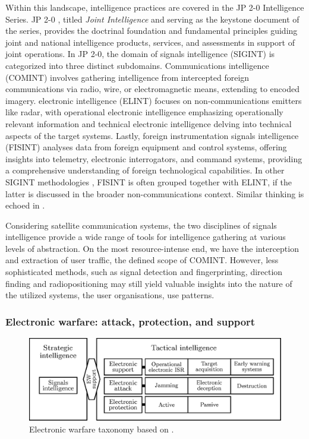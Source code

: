 \documentclass[english, 12pt, a4paper, elec, utf8, a-1b, online]{aaltothesis}
\begin{document}
Within this landscape, intelligence practices are covered in the JP 2-0 Intelligence Series.
JP 2-0 \cite{jp2-0}, titled \textit{Joint Intelligence} and serving as the keystone document of the series, provides the doctrinal foundation and fundamental principles guiding joint and national intelligence products, services, and assessments in support of joint operations.
In JP 2-0, the domain of signals intelligence (SIGINT) is categorized into three distinct subdomains. Communications intelligence (COMINT) involves gathering intelligence from intercepted foreign communications via radio, wire, or electromagnetic means, extending to encoded imagery.
electronic intelligence (ELINT) focuses on non-communications emitters like radar, with operational electronic intelligence emphasizing operationally relevant information and technical electronic intelligence delving into technical aspects of the target systems.
Lastly, foreign instrumentation signals intelligence (FISINT) analyses data from foreign equipment and control systems, offering insights into telemetry, electronic interrogators, and command systems, providing a comprehensive understanding of foreign technological capabilities.
In other SIGINT methodologies \cite{kosola2013digitaalinen}, FISINT is often grouped together with ELINT, if the latter is discussed in the broader non-communications context.
Similar thinking is echoed in \cite{national2015bulk}.

Considering satellite communication systems, the two disciplines of signals intelligence provide a wide range of tools for intelligence gathering at various levels of abstraction.
On the most resource-intense end, we have the interception and extraction of user traffic, the defined scope of COMINT.
However, less sophisticated methods, such as signal detection and fingerprinting, direction finding and radiopositioning may still yield valuable insights into the nature of the utilized systems, the user organisations, use patterns.

\subsubsection{Electronic warfare: attack, protection, and support}

\begin{figure}[h]
  \centering
  \includegraphics[width=145mm]{figures/fig-electronic-warfare.eps}
  \caption{Electronic warfare taxonomy based on \cite{kosola2013digitaalinen}.}
  \label{fig-electronic-warfare}
\end{figure}
\end{document}
